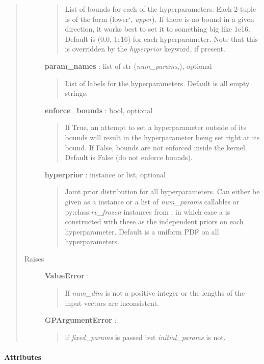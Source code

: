 \documentclass[letterpaper,10pt,english]{sphinxmanual}
\begin{document}
\begin{fulllineitems}
\begin{quote}
\begin{description}
\begin{quote}
List of bounds for each of the hyperparameters. Each 2-tuple is of the
form (lower{}`, \emph{upper}). If there is no bound in a given direction, it
works best to set it to something big like 1e16. Default is (0.0, 1e16)
for each hyperparameter. Note that this is overridden by the \emph{hyperprior}
keyword, if present.
\end{quote}

\textbf{param\_names} : list of str (\emph{num\_params},), optional
\begin{quote}

List of labels for the hyperparameters. Default is all empty strings.
\end{quote}

\textbf{enforce\_bounds} : bool, optional
\begin{quote}

If True, an attempt to set a hyperparameter outside of its bounds will
result in the hyperparameter being set right at its bound. If False,
bounds are not enforced inside the kernel. Default is False (do not
enforce bounds).
\end{quote}

\textbf{hyperprior} :  instance or list, optional
\begin{quote}

Joint prior distribution for all hyperparameters. Can either be given
as a  instance or a list of \emph{num\_params}
callables or py:class:\emph{rv\_frozen} instances from ,
in which case a  is constructed with
these as the independent priors on each hyperparameter. Default is a
uniform PDF on all hyperparameters.
\end{quote}

\item[{Raises}] \leavevmode
\textbf{ValueError} :
\begin{quote}

If \emph{num\_dim} is not a positive integer or the lengths of the input
vectors are inconsistent.
\end{quote}

\textbf{GPArgumentError} :
\begin{quote}

if \emph{fixed\_params} is passed but \emph{initial\_params} is not.
\end{quote}

\end{description}\end{quote}
\paragraph{Attributes}


\end{fulllineitems}
\end{document}
